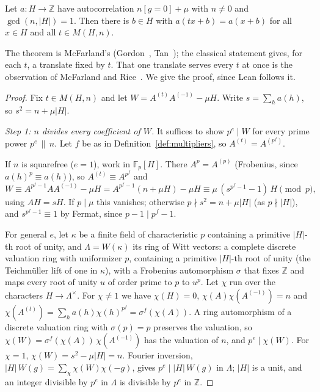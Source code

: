 \begin{theorem}[McFarland]\label{thm:multiplier}
Let $a \colon H \to \mathbb{Z}$ have autocorrelation $n[g=0] + \mu$ with $n \neq 0$ and
$\gcd(n, |H|) = 1$. Then there is $b \in H$ with $a(tx + b) = a(x + b)$ for all $x \in H$ and
all $t \in M(H, n)$.
\end{theorem}

The theorem is McFarland's (Gordon~\cite[Thm.~5.1]{gordon}, Tan~\cite[Result~3.2]{tan}); the
classical statement gives, for each $t$, a translate fixed by $t$. That one translate serves
every $t$ at once is the observation of McFarland and Rice~\cite{mcfarland-rice}. We give
the proof, since Lean follows it.

\begin{proof}
Fix $t \in M(H, n)$ and let $W = A^{(t)}A^{(-1)} - \mu H$. Write $s = \sum_h a(h)$, so
$s^2 = n + \mu|H|$.

\emph{Step 1: $n$ divides every coefficient of $W$.} It suffices to show $p^e \mid W$ for
every prime power $p^e \,\|\, n$. Let $f$ be as in Definition~\ref{def:multipliers}, so
$A^{(t)} = A^{(p^f)}$.

If $n$ is squarefree ($e = 1$), work in $\mathbb{F}_p[H]$. There $A^{p} = A^{(p)}$
(Frobenius, since $a(h)^p \equiv a(h)$), so
$A^{(t)} \equiv A^{p^f}$ and
\[
  W \equiv A^{p^f - 1} A A^{(-1)} - \mu H = A^{p^f-1}(n + \mu H) - \mu H
  \equiv \mu\,(s^{p^f - 1} - 1)\,H \pmod p ,
\]
using $AH = sH$. If $p \mid \mu$ this vanishes; otherwise $p \nmid s^2 = n + \mu|H|$
(as $p \nmid |H|$), and $s^{p^f - 1} \equiv 1$ by Fermat, since $p - 1 \mid p^f - 1$.

For general $e$, let $\kappa$ be a finite field of characteristic $p$ containing a primitive
$|H|$-th root of unity, and $\Lambda = W(\kappa)$ its ring of Witt vectors: a complete discrete
valuation ring with uniformizer $p$, containing a primitive $|H|$-th root of unity (the
Teichmüller lift of one in $\kappa$), with a Frobenius automorphism $\sigma$ that fixes
$\mathbb{Z}$ and maps every root of unity $u$ of order prime to $p$ to $u^p$. Let $\chi$ run
over the characters $H \to \Lambda^\times$. For $\chi \ne 1$ we have $\chi(H) = 0$,
$\chi(A)\chi(A^{(-1)}) = n$ and $\chi(A^{(t)}) = \sum_h a(h)\chi(h)^{p^f} = \sigma^f(\chi(A))$.
A ring automorphism of a discrete valuation ring with $\sigma(p) = p$ preserves the
valuation, so $\chi(W) = \sigma^f(\chi(A))\,\chi(A^{(-1)})$ has the valuation of $n$, and
$p^e \mid \chi(W)$. For $\chi = 1$, $\chi(W) = s^2 - \mu|H| = n$. Fourier inversion,
$|H|\,W(g) = \sum_\chi \chi(W)\chi(-g)$, gives $p^e \mid |H|\,W(g)$ in $\Lambda$; $|H|$ is a
unit, and an integer divisible by $p^e$ in $\Lambda$ is divisible by $p^e$ in $\mathbb{Z}$.


\end{proof}
